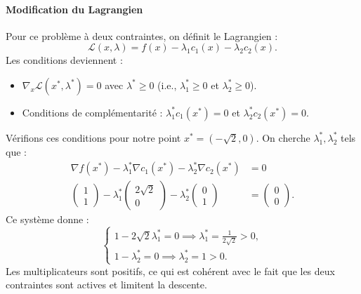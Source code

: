 \paragraph{Modification du Lagrangien}
Pour ce problème à deux contraintes, on définit le Lagrangien :
\begin{equation}
    \mathcal{L}(x, \lambda) = f(x) - \lambda_1 c_1(x) - \lambda_2 c_2(x).
\end{equation}
Les conditions deviennent :
\begin{itemize}
    \item $\nabla_x \mathcal{L}(x^*, \lambda^*) = 0$ avec $\lambda^* \ge 0$ (i.e., $\lambda_1^* \ge 0$ et $\lambda_2^* \ge 0$).
    \item Conditions de complémentarité : $\lambda_1^* c_1(x^*) = 0$ et $\lambda_2^* c_2(x^*) = 0$.
\end{itemize}

Vérifions ces conditions pour notre point $x^* = (-\sqrt{2}, 0)$.
On cherche $\lambda_1^*, \lambda_2^*$ tels que :
\begin{align*}
    \nabla f(x^*) - \lambda_1^* \nabla c_1(x^*) - \lambda_2^* \nabla c_2(x^*) &= 0 \\
    \begin{pmatrix} 1 \\ 1 \end{pmatrix} - \lambda_1^* \begin{pmatrix} 2\sqrt{2} \\ 0 \end{pmatrix} - \lambda_2^* \begin{pmatrix} 0 \\ 1 \end{pmatrix} &= \begin{pmatrix} 0 \\ 0 \end{pmatrix}.
\end{align*}
Ce système donne :
\begin{equation}
    \begin{cases}
        1 - 2\sqrt{2} \lambda_1^* = 0 \implies \lambda_1^* = \frac{1}{2\sqrt{2}} > 0, \\
        1 - \lambda_2^* = 0 \implies \lambda_2^* = 1 > 0.
    \end{cases}
\end{equation}
Les multiplicateurs sont positifs, ce qui est cohérent avec le fait que les deux contraintes sont actives et limitent la descente.
